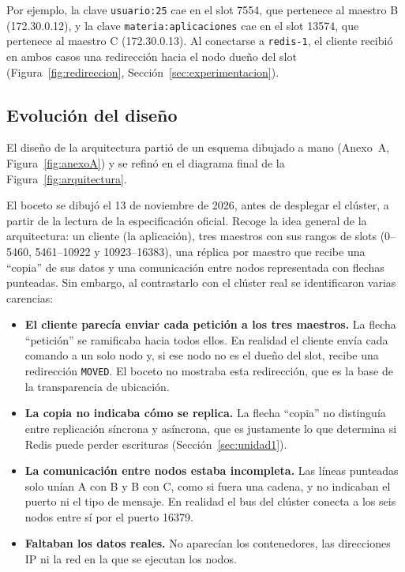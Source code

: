 \documentclass[11pt,a4paper]{article}
\begin{document}
Por ejemplo, la clave \texttt{usuario:25} cae en el slot 7554, que pertenece
al maestro B (172.30.0.12), y la clave \texttt{materia:aplicaciones} cae en el
slot 13574, que pertenece al maestro C (172.30.0.13). Al conectarse a
\texttt{redis-1}, el cliente recibió en ambos casos una redirección hacia el
nodo dueño del slot (Figura~\ref{fig:redireccion}, Sección~\ref{sec:experimentacion}).

\subsection{Evolución del diseño}

El diseño de la arquitectura partió de un esquema dibujado a mano (Anexo~A,
Figura~\ref{fig:anexoA}) y se refinó en el diagrama final de la
Figura~\ref{fig:arquitectura}.

El boceto se dibujó el 13 de noviembre de 2026, antes de desplegar el clúster,
a partir de la lectura de la especificación oficial. Recoge la idea general
de la arquitectura: un cliente (la aplicación), tres maestros con sus rangos
de slots (0--5460, 5461--10922 y 10923--16383), una réplica por maestro que
recibe una ``copia'' de sus datos y una comunicación entre nodos representada
con flechas punteadas. Sin embargo, al contrastarlo con el clúster real se
identificaron varias carencias:

\begin{itemize}
  \item \textbf{El cliente parecía enviar cada petición a los tres
  maestros.} La flecha ``petición'' se ramificaba hacia todos ellos. En
  realidad el cliente envía cada comando a un solo nodo y, si ese nodo no es
  el dueño del slot, recibe una redirección \texttt{MOVED}. El boceto no
  mostraba esta redirección, que es la base de la transparencia de ubicación.
  \item \textbf{La copia no indicaba cómo se replica.} La flecha ``copia'' no
  distinguía entre replicación síncrona y asíncrona, que es justamente lo que
  determina si Redis puede perder escrituras (Sección~\ref{sec:unidad1}).
  \item \textbf{La comunicación entre nodos estaba incompleta.} Las líneas
  punteadas solo unían A con B y B con C, como si fuera una cadena, y no
  indicaban el puerto ni el tipo de mensaje. En realidad el bus del clúster
  conecta a los seis nodos entre sí por el puerto 16379.
  \item \textbf{Faltaban los datos reales.} No aparecían los contenedores, las
  direcciones IP ni la red en la que se ejecutan los nodos.
\end{itemize}
\end{document}
